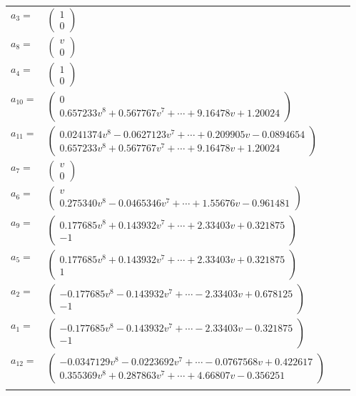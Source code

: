 \documentclass[1p]{elsarticle_modified}
\theoremstyle{definition}
\begin{document}
\begin{tabular}{m{7pt} m{180pt} m{7pt} m{180pt} }
\flushright $a_{3}=$&$\begin{pmatrix}1\\0\end{pmatrix}$ \\
\flushright $a_{8}=$&$\begin{pmatrix}v\\0\end{pmatrix}$ \\
\flushright $a_{4}=$&$\begin{pmatrix}1\\0\end{pmatrix}$ \\
\flushright $a_{10}=$&$\begin{pmatrix}0\\0.657233 v^{8}+0.567767 v^{7}+\cdots+9.16478 v+1.20024\end{pmatrix}$ \\
\flushright $a_{11}=$&$\begin{pmatrix}0.0241374 v^{8}-0.0627123 v^{7}+\cdots+0.209905 v-0.0894654\\0.657233 v^{8}+0.567767 v^{7}+\cdots+9.16478 v+1.20024\end{pmatrix}$ \\
\flushright $a_{7}=$&$\begin{pmatrix}v\\0\end{pmatrix}$ \\
\flushright $a_{6}=$&$\begin{pmatrix}v\\0.275340 v^{8}-0.0465346 v^{7}+\cdots+1.55676 v-0.961481\end{pmatrix}$ \\
\flushright $a_{9}=$&$\begin{pmatrix}0.177685 v^{8}+0.143932 v^{7}+\cdots+2.33403 v+0.321875\\-1\end{pmatrix}$ \\
\flushright $a_{5}=$&$\begin{pmatrix}0.177685 v^{8}+0.143932 v^{7}+\cdots+2.33403 v+0.321875\\1\end{pmatrix}$ \\
\flushright $a_{2}=$&$\begin{pmatrix}-0.177685 v^{8}-0.143932 v^{7}+\cdots-2.33403 v+0.678125\\-1\end{pmatrix}$ \\
\flushright $a_{1}=$&$\begin{pmatrix}-0.177685 v^{8}-0.143932 v^{7}+\cdots-2.33403 v-0.321875\\-1\end{pmatrix}$ \\
\flushright $a_{12}=$&$\begin{pmatrix}-0.0347129 v^{8}-0.0223692 v^{7}+\cdots-0.0767568 v+0.422617\\0.355369 v^{8}+0.287863 v^{7}+\cdots+4.66807 v-0.356251\end{pmatrix}$\\&\end{tabular}
\end{document}
